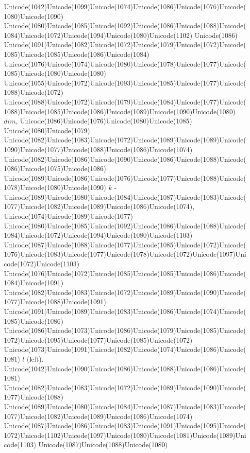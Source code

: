 \documentclass[a4paper,11pt]{report}
\begin{document}
{{{ Unicode(1042)Unicode(1099)Unicode(1074)Unicode(1086)Unicode(1076)Unicode(1080)Unicode(1090)
Unicode(1080)Unicode(1085)Unicode(1092)Unicode(1086)Unicode(1088)Unicode(1084)Unicode(1072)Unicode(1094)Unicode(1080)Unicode(1102)
Unicode(1086)
Unicode(1091)Unicode(1082)Unicode(1072)Unicode(1079)Unicode(1072)Unicode(1085)Unicode(1085)Unicode(1086)Unicode(1084)
Unicode(1076)Unicode(1074)Unicode(1080)Unicode(1078)Unicode(1077)Unicode(1085)Unicode(1080)Unicode(1080)
Unicode(1055)Unicode(1072)Unicode(1093)Unicode(1085)Unicode(1077)Unicode(1088)Unicode(1072)
Unicode(1088)Unicode(1072)Unicode(1079)Unicode(1084)Unicode(1077)Unicode(1088)Unicode(1085)Unicode(1086)Unicode(1089)Unicode(1090)Unicode(1080) $dim$, Unicode(1086)Unicode(1076)Unicode(1080)Unicode(1085)
Unicode(1080)Unicode(1079)
Unicode(1082)Unicode(1083)Unicode(1072)Unicode(1089)Unicode(1089)Unicode(1090)Unicode(1077)Unicode(1088)Unicode(1086)Unicode(1074)
Unicode(1082)Unicode(1086)Unicode(1090)Unicode(1086)Unicode(1088)Unicode(1086)Unicode(1075)Unicode(1086)
Unicode(1089)Unicode(1086)Unicode(1076)Unicode(1077)Unicode(1088)Unicode(1078)Unicode(1080)Unicode(1090) $k$ -
Unicode(1089)Unicode(1080)Unicode(1084)Unicode(1087)Unicode(1083)Unicode(1077)Unicode(1082)Unicode(1089)Unicode(1086)Unicode(1074),
Unicode(1074)Unicode(1089)Unicode(1077)
Unicode(1080)Unicode(1085)Unicode(1092)Unicode(1086)Unicode(1088)Unicode(1084)Unicode(1072)Unicode(1094)Unicode(1080)Unicode(1103)
Unicode(1087)Unicode(1088)Unicode(1077)Unicode(1085)Unicode(1072)Unicode(1076)Unicode(1083)Unicode(1077)Unicode(1078)Unicode(1072)Unicode(1097)Unicode(1072)Unicode(1103)
Unicode(1076)Unicode(1072)Unicode(1085)Unicode(1085)Unicode(1086)Unicode(1084)Unicode(1091)
Unicode(1082)Unicode(1083)Unicode(1072)Unicode(1089)Unicode(1090)Unicode(1077)Unicode(1088)Unicode(1091)
Unicode(1091)Unicode(1089)Unicode(1083)Unicode(1086)Unicode(1074)Unicode(1085)Unicode(1086)
Unicode(1086)Unicode(1073)Unicode(1086)Unicode(1079)Unicode(1085)Unicode(1072)Unicode(1095)Unicode(1077)Unicode(1085)Unicode(1072)
Unicode(1073)Unicode(1091)Unicode(1082)Unicode(1074)Unicode(1086)Unicode(1081) $l$ (left).
Unicode(1042)Unicode(1090)Unicode(1086)Unicode(1088)Unicode(1086)Unicode(1081)
Unicode(1082)Unicode(1083)Unicode(1072)Unicode(1089)Unicode(1090)Unicode(1077)Unicode(1088)
Unicode(1089)Unicode(1080)Unicode(1084)Unicode(1087)Unicode(1083)Unicode(1077)Unicode(1082)Unicode(1089)Unicode(1086)Unicode(1074)
Unicode(1087)Unicode(1086)Unicode(1083)Unicode(1091)Unicode(1095)Unicode(1072)Unicode(1102)Unicode(1097)Unicode(1080)Unicode(1081)Unicode(1089)Unicode(1103)
Unicode(1087)Unicode(1088)Unicode(1080)
}}}
\end{document}
